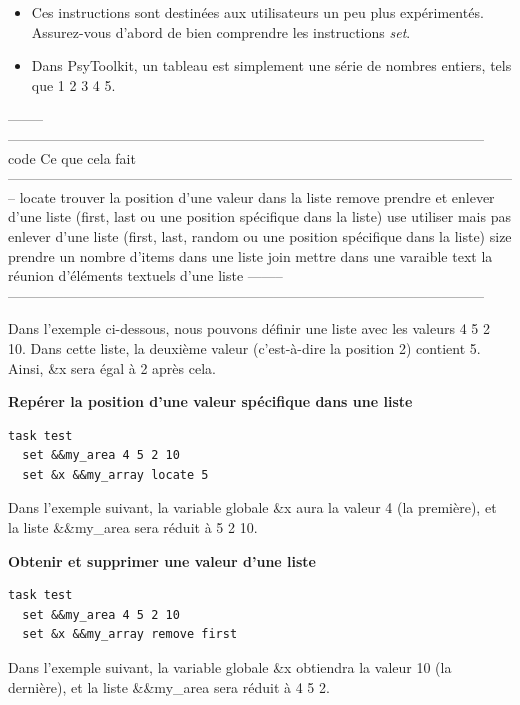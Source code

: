 \documentclass[
]{book}
\providecommand{\tightlist}{%
  \setlength{\itemsep}{0pt}\setlength{\parskip}{0pt}}
\begin{document}
\begin{itemize}
\tightlist
\item
  Ces instructions sont destinées aux utilisateurs un peu plus expérimentés. Assurez-vous d'abord de bien comprendre les instructions \emph{set}.
\item
  Dans PsyToolkit, un tableau est simplement une série de nombres entiers, tels que 1 2 3 4 5.
\end{itemize}

\textbar--------\textbar------------------------------------------------------------------------------------------------------\textbar{}
\textbar{} code \textbar{} Ce que cela fait \textbar{}
\textbar---------------------------------------\textbar-----------------------------------------------------------------------\textbar{}
\textbar{} locate \textbar{} trouver la position d'une valeur dans la liste \textbar{}
\textbar{} remove \textbar{} prendre et enlever d'une liste (first, last ou une position spécifique dans la liste) \textbar{}
\textbar{} use \textbar{} utiliser mais pas enlever d'une liste (first, last, random ou une position spécifique dans la liste)\textbar{}
\textbar{} size \textbar{} prendre un nombre d'items dans une liste \textbar{}
\textbar{} join \textbar{} mettre dans une varaible text la réunion d'éléments textuels d'une liste \textbar{}
\textbar--------\textbar------------------------------------------------------------------------------------------------------\textbar{}

Dans l'exemple ci-dessous, nous pouvons définir une liste avec les valeurs 4 5 2 10. Dans cette liste, la deuxième valeur (c'est-à-dire la position 2) contient 5. Ainsi, \&x sera égal à 2 après cela.

\textbf{Repérer la position d'une valeur spécifique dans une liste}

\begin{verbatim}
task test
  set &&my_area 4 5 2 10
  set &x &&my_array locate 5
\end{verbatim}

Dans l'exemple suivant, la variable globale \&x aura la valeur 4 (la première), et la liste \&\&my\_area sera réduit à 5 2 10.

\textbf{Obtenir et supprimer une valeur d'une liste}

\begin{verbatim}
task test
  set &&my_area 4 5 2 10
  set &x &&my_array remove first
\end{verbatim}

Dans l'exemple suivant, la variable globale \&x obtiendra la valeur 10 (la dernière), et la liste \&\&my\_area sera réduit à 4 5 2.
\end{document}
